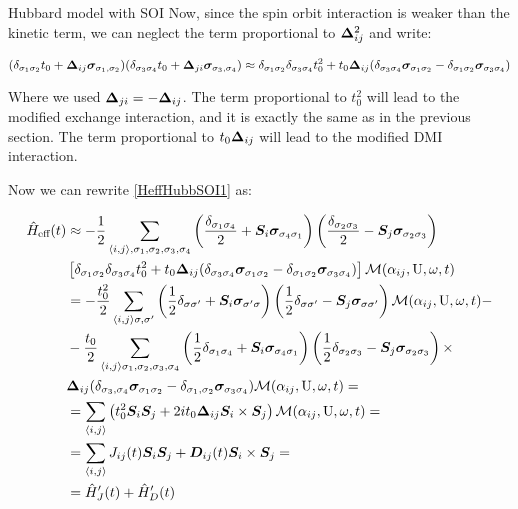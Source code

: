 \begin{section}{Hubbard model with SOI}
Now, since the spin orbit interaction is weaker than the kinetic term, we can neglect the term proportional to $\boldsymbol{\Delta}_{ij}^2$ and write:

\begin{equation}
(\delta_{\sigma_1 \sigma_2}t_0+\boldsymbol{\Delta}_{ij} \boldsymbol{\sigma}_{\sigma_1, \sigma_2}) (\delta_{\sigma_3 \sigma_4}t_0+\boldsymbol{\Delta}_{ji} \boldsymbol{\sigma}_{\sigma_3, \sigma_4}) \approx \delta_{\sigma_1 \sigma_2}\delta_{\sigma_3 \sigma_4}t_0^2 + t_0\boldsymbol{\Delta}_{ij}(\delta_{\sigma_3 \sigma_4} \boldsymbol{\sigma}_{\sigma_1 \sigma_2} - \delta_{\sigma_1 \sigma_2} \boldsymbol{\sigma}_{\sigma_3 \sigma_4})
\end{equation}

Where we used $\boldsymbol{\Delta}_{ji} = - \boldsymbol{\Delta}_{ij}$. The term proportional to $t_0^2$ will lead to the modified exchange interaction, and it is exactly the same as in the previous section. The term proportional to $t_0\boldsymbol{\Delta}_{ij}$ will lead to the modified DMI interaction.

Now we can rewrite \ref{HeffHubbSOI1} as:

\begin{align*}
\hat{H}_{\text{eff}}(t) &\approx - \frac{1}{2} \sum_{\langle i,j \rangle, \sigma_1, \sigma_2, \sigma_3, \sigma_4} \left( \frac{\delta_{\sigma_1 \sigma_4}}{2} + \boldsymbol{S}_i\boldsymbol{\sigma}_{\sigma_4 \sigma_1} \right) \left( \frac{\delta_{\sigma_2 \sigma_3}}{2} - \boldsymbol{S}_j\boldsymbol{\sigma}_{\sigma_2 \sigma_3} \right) \nonumber \\ &\left[ \delta_{\sigma_1 \sigma_2}\delta_{\sigma_3 \sigma_4}t_0^2 + t_0\boldsymbol{\Delta}_{ij}(\delta_{\sigma_3 \sigma_4} \boldsymbol{\sigma}_{\sigma_1 \sigma_2} - \delta_{\sigma_1 \sigma_2} \boldsymbol{\sigma}_{\sigma_3 \sigma_4}) \right] \mathcal{M}(\alpha_{ij}, \text{U}, \omega, t) \\
&= -\frac{t_0^2}{2} \sum_{\langle i,j \rangle \sigma, \sigma'} \left(\frac{1}{2}\delta_{\sigma \sigma'} + \boldsymbol{S}_i\boldsymbol{\sigma}_{\sigma' \sigma}\right)\left(\frac{1}{2}\delta_{\sigma \sigma'}-\boldsymbol{S}_j\boldsymbol{\sigma}_{\sigma \sigma'}\right)\mathcal{M}(\alpha_{ij}, \text{U}, \omega, t) - \\
&- \frac{t_0}{2} \sum_{\langle i,j \rangle \sigma_1, \sigma_2, \sigma_3, \sigma_4} \left(\frac{1}{2}\delta_{\sigma_1 \sigma_4} + \boldsymbol{S}_i\boldsymbol{\sigma}_{\sigma_4 \sigma_1}\right)\left(\frac{1}{2}\delta_{\sigma_2 \sigma_3}-\boldsymbol{S}_j\boldsymbol{\sigma}_{\sigma_2 \sigma_3}\right) \times \\
&\boldsymbol{\Delta}_{ij}(\delta_{\sigma_3,\sigma_4}\boldsymbol{\sigma}_{\sigma_1 \sigma_2}-\delta_{\sigma_1,\sigma_2}\boldsymbol{\sigma}_{\sigma_3 \sigma_4})\mathcal{M}(\alpha_{ij}, \text{U}, \omega, t) = \\
&= \sum_{\langle i,j \rangle} \left( t_0^2 \boldsymbol{S}_i\boldsymbol{S}_j + 2it_0\boldsymbol{\Delta}_{ij} \boldsymbol{S}_i \times \boldsymbol{S}_j \right) \mathcal{M}(\alpha_{ij}, \text{U}, \omega, t) =\\
&= \sum_{\langle i,j \rangle} J_{ij}(t)\boldsymbol{S}_i\boldsymbol{S}_j +\boldsymbol{D}_{ij}(t)\boldsymbol{S}_i \times \boldsymbol{S}_j = \\
&= \hat{H}_J'(t)+\hat{H}_D'(t)
\end{align*}


\end{section}
